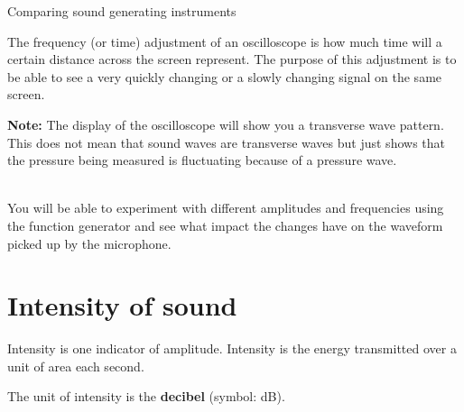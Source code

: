 \begin{activity}{Comparing sound generating instruments}
\begin{minipage}{.5\textwidth}
 	   The frequency (or time) adjustment of an oscilloscope is how much time will a certain distance across the screen represent. The purpose of this adjustment is to be able to see a very quickly changing or a slowly changing signal on the same screen. \\
\end{minipage}
\begin{minipage}{.5\textwidth}
\begin{center}
\begin{minipage}{.8\textwidth}
\textbf{Note:} The display of the oscilloscope will show you a transverse wave pattern. This does not mean that sound waves are transverse waves but just shows that the pressure being measured is fluctuating because of a pressure wave.
\end{minipage}
\end{center}
\end{minipage}
\vspace{1em}\\
You will be able to experiment with different amplitudes and frequencies using the function generator and see what impact the changes have on the waveform picked up by the microphone.\\
\end{activity}

            \section*{Intensity of sound}
            \nopagebreak

	\par
      \label{m38800*id184075}Intensity is one indicator of amplitude. Intensity is the energy transmitted over a unit of area each second.\par 
\label{m38800*id184185}The unit of intensity is the \textbf{decibel} (symbol: dB).

